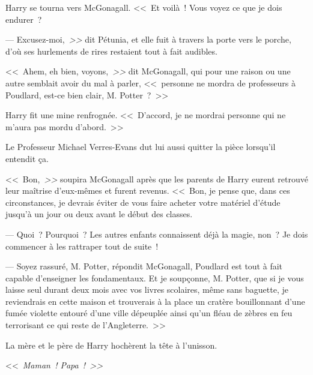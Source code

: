 Harry se tourna vers McGonagall. <<~Et voilà~! Vous voyez ce que je dois endurer~?

--- Excusez-moi,\emph{~>>} dit Pétunia, et elle fuit à travers la porte vers le porche, d'où ses hurlements de rires restaient tout à fait audibles.

<<~Ahem, eh bien, voyons,\emph{~>>} dit McGonagall, qui pour une raison ou une autre semblait avoir du mal à parler, <<~personne ne mordra de professeurs à Poudlard, est-ce bien clair, M. Potter~?~>>

Harry fit une mine renfrognée. <<~D'accord, je ne mordrai personne qui ne m'aura pas mordu d'abord.~>>

Le Professeur Michael Verres-Evans dut lui aussi quitter la pièce lorsqu'il entendit ça.

<<~Bon,\emph{~>>} soupira McGonagall après que les parents de Harry eurent retrouvé leur maîtrise d'eux-mêmes et furent revenus. <<~Bon, je pense que, dans ces circonstances, je devrais éviter de vous faire acheter votre matériel d'étude jusqu'à un jour ou deux avant le début des classes.

--- Quoi~? Pourquoi~? Les autres enfants connaissent déjà la magie, non~? Je dois commencer à les rattraper tout de suite~!

--- Soyez rassuré, M. Potter, répondit McGonagall, Poudlard est tout à fait capable d'enseigner les fondamentaux. Et je soupçonne, M. Potter, que si je vous laisse seul durant deux mois avec vos livres scolaires, même sans baguette, je reviendrais en cette maison et trouverais à la place un cratère bouillonnant d'une fumée violette entouré d'une ville dépeuplée ainsi qu'un fléau de zèbres en feu terrorisant ce qui reste de l'Angleterre.~>>

La mère et le père de Harry hochèrent la tête à l'unisson.

<<~\emph{Maman~! Papa~!~>>}
